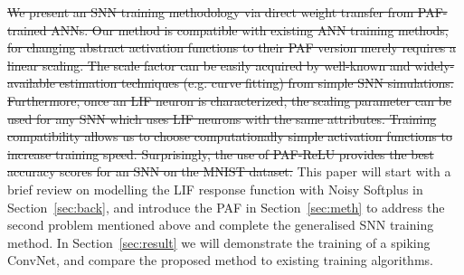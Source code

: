 \documentclass{article}
\providecommand{\DIFdeltex}[1]{{\protect\color{red}\sout{#1}}}                      %
\providecommand{\DIFdelbegin}{} %
\providecommand{\DIFdelend}{} %
\providecommand{\DIFdel}[1]{\texorpdfstring{\DIFdeltex{#1}}{}} %
\begin{document}


	

	\DIFdelbegin \DIFdel{We present an SNN training methodology via direct weight transfer from PAF-trained ANNs. Our method is compatible with existing ANN training methods, for changing abstract activation functions to their PAF version merely requires a linear scaling. The scale factor can be easily acquired by well-known and widely-available estimation techniques (e.g. curve fitting) from simple SNN simulations. Furthermore, once an LIF neuron is characterized, the scaling parameter can be used for any SNN which uses  LIF neurons with the same attributes. Training compatibility allows us to choose computationally simple activation functions to increase training speed. Surprisingly, the use of PAF-ReLU provides the best accuracy scores for an SNN on the MNIST dataset.
}\DIFdelend This paper will start with a brief review on modelling the LIF response function with Noisy Softplus in Section~\ref{sec:back}, and introduce the PAF in Section~\ref{sec:meth} to address the second problem mentioned above and complete the generalised SNN training method.
	In Section~\ref{sec:result} we will demonstrate the training of a spiking ConvNet, and compare the proposed method to existing training algorithms.
\end{document}

